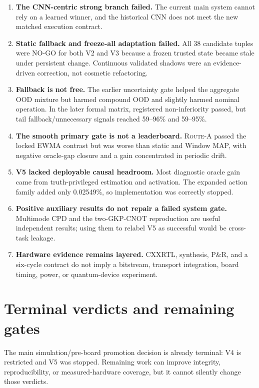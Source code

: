 \documentclass[11pt]{article}
\newcommand{\RouteA}{\textsc{Route-A}}
\begin{document}
\begin{enumerate}
  \item \textbf{The CNN-centric strong branch failed.}  The current main system
  cannot rely on a learned winner, and the historical CNN does not meet the new
  matched execution contract.
  \item \textbf{Static fallback and freeze-all adaptation failed.}  All 38
  candidate tuples were NO-GO for both V2 and V3 because a frozen trusted state
  became stale under persistent change.  Continuous validated shadows were an
  evidence-driven correction, not cosmetic refactoring.
  \item \textbf{Fallback is not free.}  The earlier uncertainty gate helped the
  aggregate OOD mixture but harmed compound OOD and slightly harmed nominal
  operation.  In the later formal matrix, registered non-inferiority passed,
  but tail fallback/unnecessary signals reached 59--96\% and 59--95\%.
  \item \textbf{The smooth primary gate is not a leaderboard.}  \RouteA{}
  passed the locked EWMA contrast but was worse than static and Window MAP, with
  negative oracle-gap closure and a gain concentrated in periodic drift.
  \item \textbf{V5 lacked deployable causal headroom.}  Most diagnostic oracle
  gain came from truth-privileged estimation and activation.  The expanded
  action family added only 0.02549\%, so implementation was correctly stopped.
  \item \textbf{Positive auxiliary results do not repair a failed system gate.}
  Multimode CPD and the two-GKP-CNOT reproduction are useful independent
  results; using them to relabel V5 as successful would be cross-task leakage.
  \item \textbf{Hardware evidence remains layered.}  CXXRTL, synthesis, P\&R,
  and a six-cycle contract do not imply a bitstream, transport integration,
  board timing, power, or quantum-device experiment.
\end{enumerate}

\section{Terminal verdicts and remaining gates}

The main simulation/pre-board promotion decision is already terminal: V4 is
restricted and V5 was stopped.  Remaining work can improve integrity,
reproducibility, or measured-hardware coverage, but it cannot silently change
those verdicts.
\end{document}
